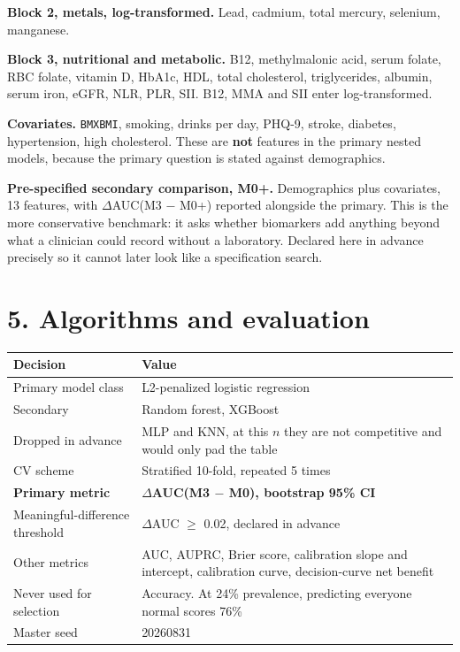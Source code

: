 \documentclass[11pt]{article}
\begin{document}
\textbf{Block 2, metals, log-transformed.} Lead, cadmium, total mercury, selenium, manganese.

\textbf{Block 3, nutritional and metabolic.} B12, methylmalonic acid, serum folate, RBC folate, vitamin D, HbA1c, HDL, total cholesterol, triglycerides, albumin, serum iron, eGFR, NLR, PLR, SII. B12, MMA and SII enter log-transformed.

\textbf{Covariates.} \texttt{BMXBMI}, smoking, drinks per day, PHQ-9, stroke, diabetes, hypertension, high cholesterol. These are \textbf{not} features in the primary nested models, because the primary question is stated against demographics.

\textbf{Pre-specified secondary comparison, M0+.} Demographics plus covariates, 13 features, with $\Delta$AUC(M3 $-$ M0+) reported alongside the primary. This is the more conservative benchmark: it asks whether biomarkers add anything beyond what a clinician could record without a laboratory. Declared here in advance precisely so it cannot later look like a specification search.

\section*{5. Algorithms and evaluation}

\begin{longtable}{L{4.5cm}L{8.5cm}}
\toprule
Decision & Value \\
\midrule
\endhead
Primary model class & L2-penalized logistic regression \\
Secondary & Random forest, XGBoost \\
Dropped in advance & MLP and KNN, at this $n$ they are not competitive and would only pad the table \\
CV scheme & Stratified 10-fold, repeated 5 times \\
\textbf{Primary metric} & \textbf{$\Delta$AUC(M3 $-$ M0), bootstrap 95\% CI} \\
Meaningful-difference threshold & $\Delta$AUC $\geq$ 0.02, declared in advance \\
Other metrics & AUC, AUPRC, Brier score, calibration slope and intercept, calibration curve, decision-curve net benefit \\
Never used for selection & Accuracy. At 24\% prevalence, predicting everyone normal scores 76\% \\
Master seed & 20260831 \\
\bottomrule
\end{longtable}
\end{document}

